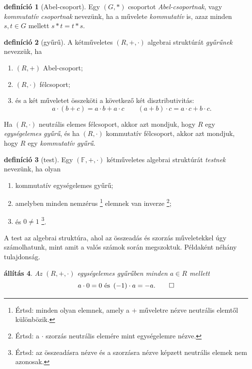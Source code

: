 \documentclass[a4paper, showtrims]{memoir}
\theoremstyle{plain}
\newtheorem{proposition}{állítás}[chapter]
\theoremstyle{remark}
\theoremstyle{definition}
\newtheorem{definition}[proposition]{definíció}
\begin{document}
\begin{definition}[Abel-csoport]
    Egy $\left( G,\ast \right)$ csoportot \emph{Abel-csoportnak}, vagy \emph{kommutatív csoportnak} nevezünk,
	ha a művelete \emph{kommutatív} is,
	azaz minden $s,t\in G$ mellett $s\ast t=t\ast s$.
\end{definition}
\begin{definition}[gyűrű]
	A kétműveletes $\left( R,+,\cdot \right)$ algebrai struktúrát \emph{gyűrűnek} nevezzük,
	ha
	\begin{enumerate}
		\item $\left( R,+ \right)$ Abel-csoport;
		\item $\left( R,\cdot \right)$ félcsoport;
		\item és a két műveletet összeköti a következő két disztributivitás:
		      \[
			      a\cdot\left( b+c \right)=a\cdot b + a\cdot c\qquad
			      \left( a + b \right)\cdot c=a\cdot c+b\cdot c.
		      \]
	\end{enumerate}
	Ha $\left( R,\cdot \right)$ neutrális elemes félcsoport, akkor azt mondjuk, hogy $R$ egy
	\emph{egységelemes gyűrű}, és ha $\left( R,\cdot \right)$ kommutatív félcsoport, akkor
	azt mondjuk, hogy $R$ egy \emph{kommutatív gyűrű}.
\end{definition}
\begin{definition}[test]
	Egy $\left( \mathbb{F},+,\cdot \right)$ kétműveletes algebrai struktúrát \emph{testnek}
	nevezünk, ha olyan 
    \begin{enumerate}
        \item 
            kommutatív egységelemes gyűrű;
        \item
            amelyben minden nemzérus%
            \footnote{Értsd: minden olyan elemnek, 
            amely a $+$ műveletre nézve neutrális elemtől különbözik.}
            elemnek van inverze%
            \footnote{Értsd: a $\cdot$ szorzás neutrális elemére mint egységelemre nézve.};
        \item
            és $0\neq 1$%
            \footnote{Értsd: az összeadásra nézve és a szorzásra nézve képzett neutrális elemek 
            nem azonosak.}.\qedhere
    \end{enumerate}
\end{definition}
A test az algebrai struktúra, ahol az összeadás és szorzás műveletekkel úgy számolhatunk, mint amit a valós számok során megszoktuk.
Példaként néhány tulajdonság.
\begin{proposition}
	Az $\left( R,+,\cdot \right)$ egységelemes gyűrűben minden $a\in R$ mellett
	\begin{equation*}
		a\cdot 0=0\text{ és }
		\left( -1 \right)\cdot a=-a.\qedhere
	\end{equation*}
\end{proposition}
\end{document}
